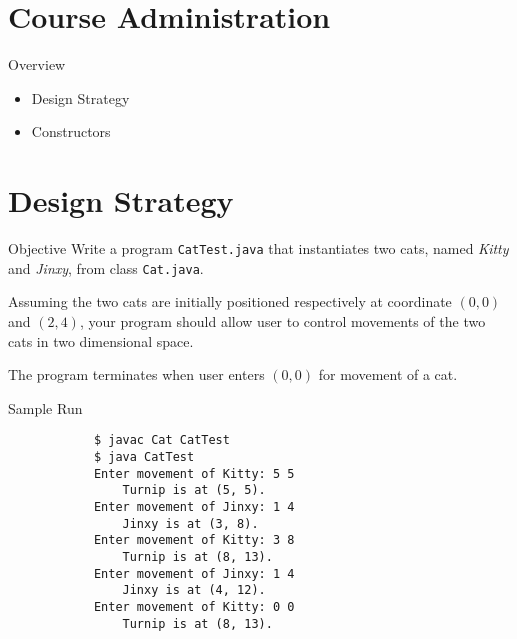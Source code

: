\documentclass[10pt, compress]{beamer}
\begin{document}
\prepareCover

\section{Course Administration}

\begin{slide}
	\begin{block}{Overview}
		\begin{itemize}
			\item[] Design Strategy
			\item[] Constructors
		\end{itemize}
	\end{block}
\end{slide}

\section{Design Strategy}

\begin{slide}
	\begin{block}{Objective}
		Write a program \texttt{CatTest.java} that instantiates two cats, named \textit{Kitty} and \textit{Jinxy}, from class \texttt{Cat.java}.

		Assuming the two cats are initially positioned respectively at coordinate $(0, 0)$ and $(2, 4)$, your program should allow user to control movements of the two cats in two dimensional space.

		The program terminates when user enters $(0, 0)$ for movement of a cat.
	\end{block}
\end{slide}

\begin{slide}
	\begin{block}{Sample Run}
		\begin{verbatim}
			$ javac Cat CatTest
			$ java CatTest
			Enter movement of Kitty: 5 5
				Turnip is at (5, 5).
			Enter movement of Jinxy: 1 4
				Jinxy is at (3, 8).
			Enter movement of Kitty: 3 8
				Turnip is at (8, 13).
			Enter movement of Jinxy: 1 4
				Jinxy is at (4, 12).
			Enter movement of Kitty: 0 0
				Turnip is at (8, 13).
		\end{verbatim}
	\end{block}
\end{slide}
\end{document}
